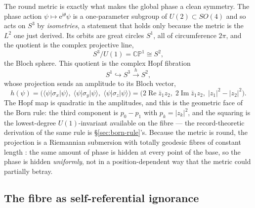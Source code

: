 The round metric is exactly what makes the global phase a clean symmetry. The phase action
$\psi\mapsto\mathrm{e}^{\mathrm{i}\theta}\psi$ is a one-parameter subgroup of
$U(2)\subset SO(4)$ and so acts on $S^{3}$ by \emph{isometries}, a statement that holds only
because the metric is the $L^{2}$ one just derived. Its orbits are great circles $S^{1}$, all of
circumference $2\pi$, and the quotient is the complex projective line,
\begin{equation}
  S^{3}\big/U(1)=\mathbb{CP}^{1}\cong S^{2},
\end{equation}
the Bloch sphere. This quotient is the complex Hopf fibration
\autocite{Hopf1931, Urbantke2003, mosseri2001hopf}
\begin{equation}
  S^{1}\hookrightarrow S^{3}\xrightarrow{\;h\;}S^{2},
\end{equation}
whose projection sends an amplitude to its Bloch vector,
\begin{equation}
  h(\psi)=\bigl(\langle\psi\rvert\sigma_{x}\lvert\psi\rangle,\;
                 \langle\psi\rvert\sigma_{y}\lvert\psi\rangle,\;
                 \langle\psi\rvert\sigma_{z}\lvert\psi\rangle\bigr)
        =\bigl(2\operatorname{Re}\bar z_{1}z_{2},\;
               2\operatorname{Im}\bar z_{1}z_{2},\;
               \lvert z_{1}\rvert^{2}-\lvert z_{2}\rvert^{2}\bigr).
\end{equation}
The Hopf map is quadratic in the amplitudes, and this is the geometric face of the Born rule:
the third component is $p_{0}-p_{1}$ with $p_{k}=\lvert z_{k}\rvert^{2}$, and the squaring is
the lowest-degree $U(1)$-invariant available on the fibre --- the record-theoretic derivation of
the same rule is \S\ref{sec:born-rule}'s. Because the metric is round, the projection is a
Riemannian submersion with totally geodesic fibres of constant length
\autocite{GluckWarnerZiller1986}: the same amount of phase is hidden at every point of the base,
so the phase is hidden \emph{uniformly}, not in a position-dependent way that the metric could
partially betray.

\subsection{The fibre as self-referential ignorance}
\label{sec:fibre-self-ignorance}

